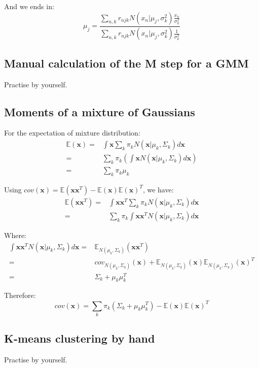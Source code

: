 \documentclass[UTF8]{ctexart}
\begin{document}
And we ends in:
$$\mu_{j}=\frac{\sum_{n,k}r_{njk}N(x_{n}|\mu_{j},\sigma^{2}_{k})\frac{x_{n}}{\sigma^{2}_{k}}} { \sum_{n,k}r_{njk}N(x_{n}|\mu_{j},\sigma^{2}_{k})\frac{1}{\sigma^{2}_{k}}}$$

\subsection{Manual calculation of the M step for a GMM}
Practise by yourself.

\subsection{Moments of a mixture of Gaussians}
For the expectation of mixture distribution:
\begin{align}
\mathbb{E}(\textbf{x})=&\int\textbf{x}\sum_{k}\pi_{k}N(\textbf{x}|\mu_{k},\Sigma_{k})d\textbf{x}\nonumber \\
=&\sum_{k}\pi_{k}(\int\textbf{x}N(\textbf{x}|\mu_{k},\Sigma_{k})d\textbf{x})\nonumber \\
=&\sum_{k}\pi_{k}\mu_{k}\nonumber 
\end{align}

Using $cov(\textbf{x})=\mathbb{E}(\textbf{x}\textbf{x}^{T})-\mathbb{E}(\textbf{x})\mathbb{E}(\textbf{x})^{T}$, we have:
\begin{align}
\mathbb{E}(\textbf{x}\textbf{x}^{T})=&\int \textbf{x}\textbf{x}^{T}\sum_{k}\pi_{k}N(\textbf{x}|\mu_{k},\Sigma_{k})d\textbf{x}\nonumber \\
=&\sum_{k}\pi_{k}\int \textbf{x}\textbf{x}^{T}N(\textbf{x}|\mu_{k},\Sigma_{k})d\textbf{x}\nonumber 
\end{align}

Where:
\begin{align}
\int \textbf{x}\textbf{x}^{T}N(\textbf{x}|\mu_{k},\Sigma_{k})d\textbf{x}=&\mathbb{E}_{N(\mu_{k},\Sigma_{k})}(\textbf{x}\textbf{x}^{T})\nonumber \\
=&cov_{N(\mu_{k},\Sigma_{k})}(\textbf{x})+\mathbb{E}_{N(\mu_{k},\Sigma_{k})}(\textbf{x})\mathbb{E}_{N(\mu_{k},\Sigma_{k})}(\textbf{x})^{T} \nonumber \\
=&\Sigma_{k}+\mu_{k}\mu_{k}^{T}\nonumber
\end{align}

Therefore:
$$cov(\textbf{x})=\sum_{k}\pi_{k}(\Sigma_{k}+\mu_{k}\mu_{k}^{T})-\mathbb{E}(\textbf{x})\mathbb{E}(\textbf{x})^{T}$$

\subsection{K-means clustering by hand}
Practise by yourself.
\end{document}

